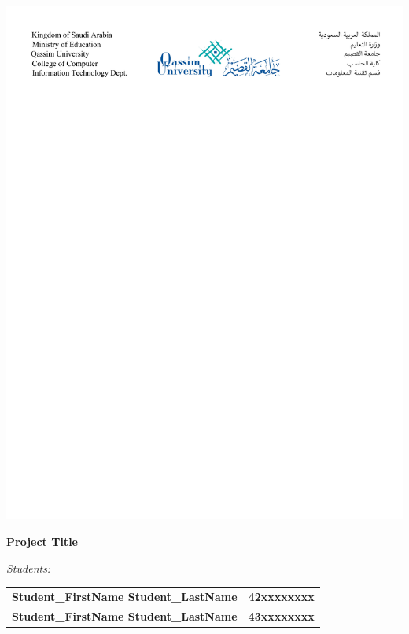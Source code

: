 \documentclass[11pt,a4paper]{report}
\newcommand{\firststudentname}{\textbf{Student\_FirstName Student\_LastName}}
\newcommand{\firststudentid}{\textbf{42xxxxxxxx}}
\newcommand{\secondstudentname}{\textbf{Student\_FirstName Student\_LastName}}
\newcommand{\secindstudentid}{\textbf{43xxxxxxxx}}
\begin{document}
\begin{titlepage}
  
  \begin{center}
    \includegraphics[width=\textwidth]{figures/essentials/header.pdf}
  \end{center}
  
  \begin{center}
    \vspace{3cm}
    \huge
    \textbf{Project Title}
    
    \Large
    \vspace{3cm}
    \textit{Students:}\\
    \Large
    
    
    \begin{tabular}{lr}
      {\firststudentname}  & {\firststudentid}  \\
      {\secondstudentname} & {\secindstudentid} 
    \end{tabular}
    

\end{center}
\end{titlepage}
\end{document}
